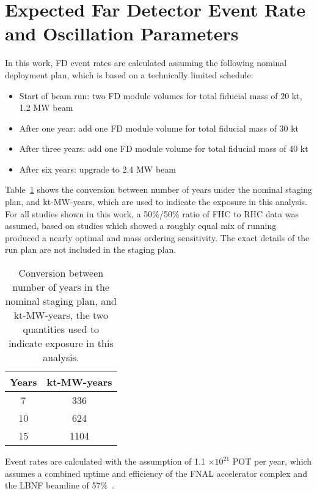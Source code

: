 \section{Expected Far Detector Event Rate and Oscillation Parameters}
\label{sec:rate}

In this work, FD event rates are calculated assuming the following nominal deployment plan, which is based on a technically limited schedule:
\begin{itemize}
    \item Start of beam run: two FD module
    volumes for total fiducial mass of 20 kt, 1.2 MW beam
    \item After one year: add one FD module  volume for total fiducial mass of 30 kt
    \item After three years: add one FD module  volume for total fiducial mass of 40 kt
    \item After six years: upgrade to 2.4 MW beam
\end{itemize}
Table~\ref{tab:exposures} shows the conversion between number of years under the nominal staging plan, and  kt-MW-years, which are used to indicate the exposure in this analysis. For all studies shown in this work, a 50\%/50\% ratio of FHC to RHC data was assumed, based on studies which showed a roughly equal mix of running produced a nearly optimal \deltacp and mass ordering sensitivity. The exact details of the run plan are not included in the staging plan.

\begin{table}[htbp]
  \centering
  \begin{tabular}{cc}
    \hline
    Years & kt-MW-years \\
    \hline\hline
    7 & 336 \\
    10 & 624 \\
    15 & 1104 \\
    \hline
  \end{tabular}
  \caption{Conversion between number of years in the nominal staging plan, and kt-MW-years, the two quantities used to indicate exposure in this analysis.}
  \label{tab:exposures}
\end{table}

Event rates are calculated with the assumption of 1.1 $\times 10^{21}$ POT per year, which assumes a combined uptime and efficiency of the FNAL accelerator complex and the LBNF beamline of 57\%~\cite{Abi:2020evt}.

